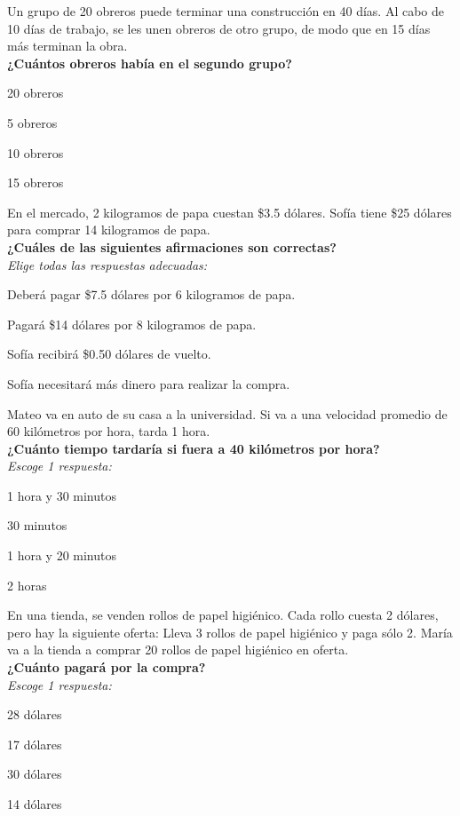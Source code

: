 \documentclass[11pt]{book}
\newenvironment{questions}[1][]{\enumerate[,#1]}{\endenumerate}
\newcommand{\choice}{\item}
\begin{document}
\begin{questions}[start=1]%
  \question[10]  Un grupo de 20 obreros puede terminar una
  construcción en 40 días. Al cabo de 10 días de trabajo,
  se les unen obreros de otro grupo, de modo que en 15 días
  más terminan la obra.\\
  \textbf{¿Cuántos obreros había en el segundo grupo?}\\
  \begin{oneparchoices}
    \choice 20 obreros
    \choice 5 obreros
    \choice 10 obreros
    \choice 15 obreros
  \end{oneparchoices}

  \question[10] En el mercado, 2 kilogramos de papa cuestan \$3.5 dólares.
  Sofía tiene \$25 dólares para comprar 14 kilogramos de papa.\\
  \textbf{¿Cuáles de las siguientes afirmaciones son correctas?}\\
  \emph{Elige todas las respuestas adecuadas:}\\
  \begin{choices}
    \choice Deberá pagar \$7.5 dólares por 6 kilogramos de papa.
    \choice Pagará \$14 dólares por 8 kilogramos de papa.
    \choice Sofía recibirá \$0.50 dólares de vuelto.
    \choice Sofía necesitará más dinero para realizar la compra.
  \end{choices}

  \question[10] Mateo va en auto de su casa a la universidad. Si va a una velocidad promedio de 60 kilómetros por hora, tarda 1 hora.\\
  \textbf{¿Cuánto tiempo tardaría si fuera a 40 kilómetros por hora?}\\
  \emph{Escoge 1 respuesta:}\\
  \begin{oneparchoices}
    \choice 1 hora y 30 minutos
    \choice 30 minutos
    \choice 1 hora y 20 minutos
    \choice 2 horas
  \end{oneparchoices}

  \question[10] En una tienda, se venden rollos de papel higiénico. Cada rollo cuesta 2 dólares, pero hay la siguiente oferta:
  Lleva 3 rollos de papel higiénico y paga s\'olo 2.
  María va a la tienda a comprar 20 rollos de papel higiénico en oferta.\\
  \textbf{¿Cuánto pagará por la compra?}\\
  \emph{Escoge 1 respuesta:}\\
  \begin{oneparchoices}
    \choice 28 dólares
    \choice 17 dólares
    \choice 30 dólares
    \choice 14 dólares
  \end{oneparchoices}


\end{questions}
\end{document}
